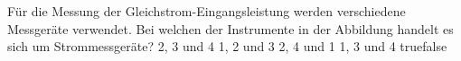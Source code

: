     {Für die Messung der Gleichstrom-Eingangsleistung werden verschiedene Messgeräte verwendet. Bei welchen der Instrumente in der Abbildung handelt es sich um Strommessgeräte?}
    {2, 3 und 4}
    {1, 2 und 3}
    {2, 4 und 1}
    {1, 3 und 4}
    {true}{false}